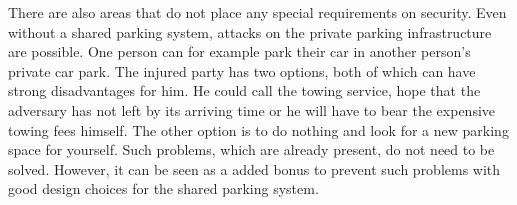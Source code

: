There are also areas that do not place any special requirements on security. Even without a shared parking system, attacks on the private parking infrastructure are possible. One person can for example park their car in another person's private car park. The injured party has two options, both of which can have strong disadvantages for him. He could call the towing service, hope that the adversary has not left by its arriving time or he will have to bear the expensive towing fees himself. The other option is to do nothing and look for a new parking space for yourself. Such problems, which are already present, do not need to be solved. However, it can be seen as a added bonus to prevent such problems with good design choices for the shared parking system.
